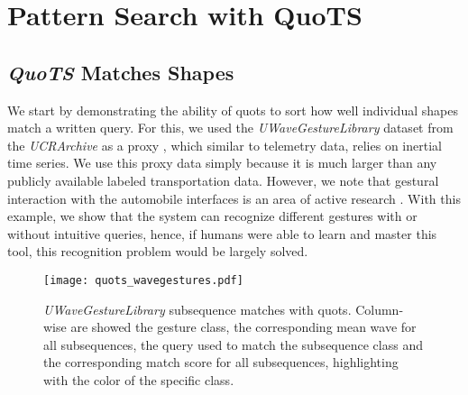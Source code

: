 \section{Pattern Search with QuoTS}

\subsection{\textit{QuoTS} Matches Shapes}

We start by demonstrating the ability of \gls{quots} to sort how well individual shapes match a written query. For this, we used the \textit{UWaveGestureLibrary} dataset from the \textit{UCRArchive} as a proxy \cite{uWave}, which similar to telemetry data, relies on inertial time series. We use this proxy data simply because it is much larger than any publicly available labeled transportation data. However, we note that gestural interaction with the automobile interfaces is an area of active research \cite{autoui1, autoui2}. With this example, we show that the system can recognize different gestures with or without intuitive queries, hence, if humans were able to learn and master this tool, this recognition problem would be largely solved.

\begin{figure}
\centering
\texttt{[image: quots\_wavegestures.pdf]}
\caption{\textit{UWaveGestureLibrary} subsequence matches with \gls{quots}. Column-wise are showed the gesture class, the corresponding mean wave for all subsequences, the query used to match the subsequence class and the corresponding match score for all subsequences, highlighting with the color of the specific class.}
\label{fig:quots_uwave}
\end{figure}

